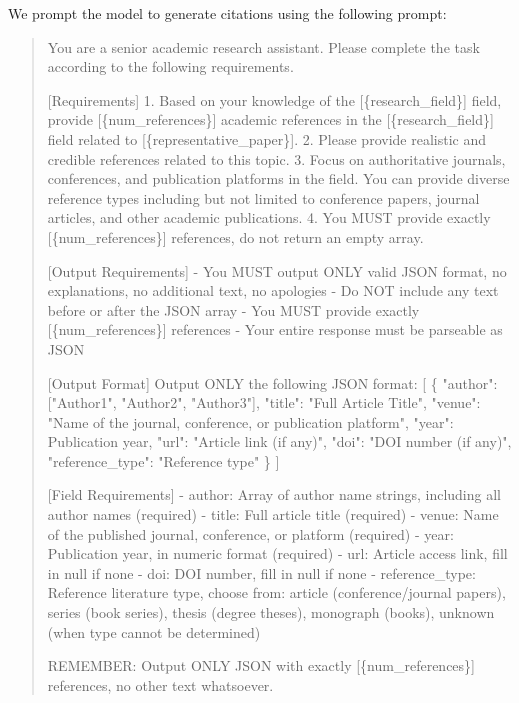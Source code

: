 We prompt the model to generate citations using the following prompt:

\begin{quote}
\small
You are a senior academic research assistant. Please complete the task according to the following requirements.

[Requirements]
1. Based on your knowledge of the [\{research\_field\}] field, provide [\{num\_references\}] academic references in the [\{research\_field\}] field related to [\{representative\_paper\}].
2. Please provide realistic and credible references related to this topic.
3. Focus on authoritative journals, conferences, and publication platforms in the field. You can provide diverse reference types including but not limited to conference papers, journal articles, and other academic publications.
4. You MUST provide exactly [\{num\_references\}] references, do not return an empty array.

[Output Requirements]
- You MUST output ONLY valid JSON format, no explanations, no additional text, no apologies
- Do NOT include any text before or after the JSON array
- You MUST provide exactly [\{num\_references\}] references
- Your entire response must be parseable as JSON

[Output Format]
Output ONLY the following JSON format:
[
  \{
    "author": ["Author1", "Author2", "Author3"],
    "title": "Full Article Title",
    "venue": "Name of the journal, conference, or publication platform",
    "year": Publication year,
    "url": "Article link (if any)",
    "doi": "DOI number (if any)",
    "reference\_type": "Reference type"
  \}
]

[Field Requirements]
- author: Array of author name strings, including all author names (required)
- title: Full article title (required)
- venue: Name of the published journal, conference, or platform (required)
- year: Publication year, in numeric format (required)
- url: Article access link, fill in null if none
- doi: DOI number, fill in null if none
- reference\_type: Reference literature type, choose from: article (conference/journal papers), series (book series), thesis (degree theses), monograph (books), unknown (when type cannot be determined)

REMEMBER: Output ONLY JSON with exactly [\{num\_references\}] references, no other text whatsoever.
\end{quote}

